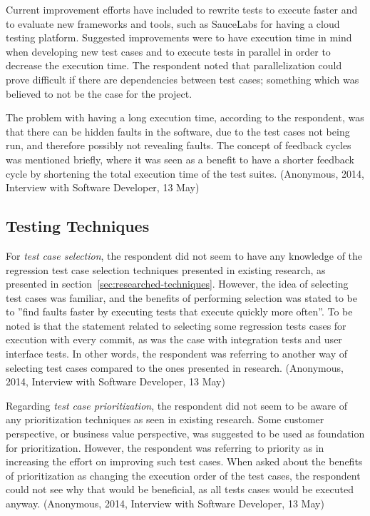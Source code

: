 \documentclass[a4paper,english,12pt]{report}
\begin{document}
Current improvement efforts have included to rewrite tests to execute faster and to evaluate new frameworks and tools, such as SauceLabs for having a cloud testing platform. Suggested improvements were to have execution time in mind when developing new test cases and to execute tests in parallel in order to decrease the execution time. The respondent noted that parallelization could prove difficult if there are dependencies between test cases; something which was believed to not be the case for the project.

The problem with having a long execution time, according to the respondent, was that there can be hidden faults in the software, due to the test cases not being run, and therefore possibly not revealing faults. The concept of feedback cycles was mentioned briefly, where it was seen as a benefit to have a shorter feedback cycle by shortening the total execution time of the test suites. (Anonymous, 2014, Interview with Software Developer, 13 May)

\subsection{Testing Techniques}\label{sec:interview-testing-techniques}
For \textit{test case selection}, the respondent did not seem to have any knowledge of the regression test case selection techniques presented in existing research, as presented in section~\ref{sec:researched-techniques}. However, the idea of selecting test cases was familiar, and the benefits of performing selection was stated to be to ''find faults faster by executing tests that execute quickly more often''. To be noted is that the statement related to selecting some regression tests cases for execution with every commit, as was the case with integration tests and user interface tests. In other words, the respondent was referring to another way of selecting test cases compared to the ones presented in research. (Anonymous, 2014, Interview with Software Developer, 13 May)

Regarding \textit{test case prioritization}, the respondent did not seem to be aware of any prioritization techniques as seen in existing research. Some customer perspective, or business value perspective, was suggested to be used as foundation for prioritization. However, the respondent was referring to priority as in increasing the effort on improving such test cases. When asked about the benefits of prioritization as changing the execution order of the test cases, the respondent could not see why that would be beneficial, as all tests cases would be executed anyway. (Anonymous, 2014, Interview with Software Developer, 13 May)
\end{document}
